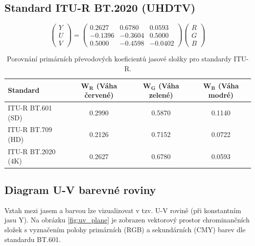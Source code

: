 \documentclass[FM,DP]{tulthesis}
\begin{document}
\subsection{Standard ITU-R BT.2020 (UHDTV)}

\begin{equation}
    \begin{pmatrix}
        Y \\
        U \\
        V
    \end{pmatrix}
    =
    \begin{pmatrix}
        0.2627  & 0.6780  & 0.0593  \\
        -0.1396 & -0.3604 & 0.5000  \\
        0.5000  & -0.4598 & -0.0402
    \end{pmatrix}
    \begin{pmatrix}
        R \\
        G \\
        B
    \end{pmatrix}
    \label{eq:bt2020}
\end{equation}

\begin{table}[htbp]
    \centering
    \caption{Porovnání primárních převodových koeficientů jasové složky pro standardy ITU-R.}
    \begin{tabular}{lccc}
        \toprule
        \textbf{Standard}  & $\mathbf{W_R}$ (Váha červené) & $\mathbf{W_G}$ (Váha zelené) & $\mathbf{W_B}$ (Váha modré) \\
        \midrule
        ITU-R BT.601 (SD)  & 0.2990                        & 0.5870                       & 0.1140                      \\
        ITU-R BT.709 (HD)  & 0.2126                        & 0.7152                       & 0.0722                      \\
        ITU-R BT.2020 (4K) & 0.2627                        & 0.6780                       & 0.0593                      \\
        \bottomrule
    \end{tabular}
    \label{tab:yuv_coeffs}
\end{table}

\subsection{Diagram U-V barevné roviny}

Vztah mezi jasem a barvou lze vizualizovat v tzv. U-V rovině (při konstantním
jasu Y). Na obrázku \ref{fig:uv_plane} je zobrazen vektorový prostor
chrominančních složek s vyznačením polohy primárních (RGB) a sekundárních (CMY)
barev dle standardu BT.601.
\end{document}
